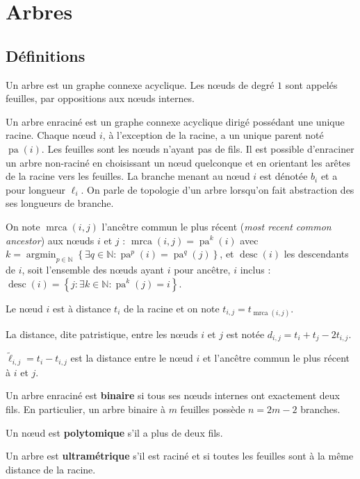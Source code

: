 \documentclass[12pt,a4paper]{reedthesis}
\newcommand \NN {\mathbb{N}}
\DeclareMathOperator*{\argmin}{argmin}
\DeclareMathOperator*{\pa}{pa}
\DeclareMathOperator*{\mrca}{mrca}
\DeclareMathOperator*{\desc}{desc}
\theoremstyle{definition}
\theoremstyle{definition}
\theoremstyle{definition}
\theoremstyle{remark}
\begin{document}
\hypertarget{arbres}{%
\chapter{Arbres}\label{arbres}}

\hypertarget{duxe9finitions}{%
\section{Définitions}\label{duxe9finitions}}

Un arbre est un graphe connexe acyclique. Les nœuds de degré \(1\) sont appelés feuilles, par oppositions aux nœuds internes.

Un arbre enraciné est un graphe connexe acyclique dirigé possédant une unique racine. Chaque nœud \(i\), à l'exception de la racine, a un unique parent noté \(\pa(i)\). Les feuilles sont les nœuds n'ayant pas de fils. Il est possible d'enraciner un arbre non-raciné en choisissant un nœud quelconque et en orientant les arêtes de la racine vers les feuilles. La branche menant au nœud \(i\) est dénotée \(b_i\) et a pour longueur \(\ell_i\). On parle de topologie d'un arbre lorsqu'on fait abstraction des ses longueurs de branche.

On note \(\mrca(i,j)\) l'ancêtre commun le plus récent (\emph{most recent common ancestor}) aux nœuds \(i\) et \(j\) : \(\mrca(i,j) = \pa^k(i)\) avec \(k = \argmin_{p\in \NN}\left\{\exists q \in \NN : \pa^p(i) = \pa^q(j)\right\}\), et \(\desc(i)\) les descendants de \(i\), soit l'ensemble des nœuds ayant \(i\) pour ancêtre, \(i\) inclus : \(\desc(i) = \left\{j : \exists k \in \NN : \pa^k(j)=i\right\}\).

Le nœud \(i\) est à distance \(t_i\) de la racine et on note \(t_{i,j} = t_{\mrca(i,j)}\).

La distance, dite patristique, entre les nœuds \(i\) et \(j\) est notée \(d_{i,j} = t_i + t_j - 2 t_{i,j}\).

\(\tilde{\ell}_{i,j} = t_i - t_{i,j}\) est la distance entre le nœud \(i\) et l'ancêtre commun le plus récent à \(i\) et \(j\).

Un arbre enraciné est \textbf{binaire} si tous ses nœuds internes ont exactement deux fils. En particulier, un arbre binaire à \(m\) feuilles possède \(n = 2m-2\) branches.

Un nœud est \textbf{polytomique} s'il a plus de deux fils.

Un arbre est \textbf{ultramétrique} s'il est raciné et si toutes les feuilles sont à la même distance de la racine.
\end{document}
